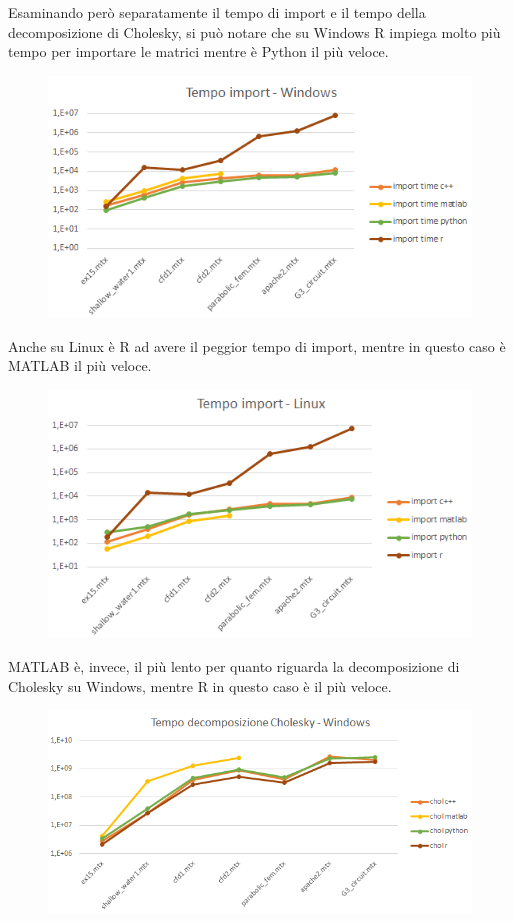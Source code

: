 \documentclass[a4paper,10pt]{article}
\begin{document}
Esaminando però separatamente il tempo di import e il tempo della decomposizione di Cholesky, si può notare che su Windows R impiega molto più tempo per importare le matrici mentre è Python il più veloce.

\begin{figure}[H]
\centering
  \includegraphics[width=0.6\linewidth]{img/tempoimpwin.png}
\end{figure}

Anche su Linux è R ad avere il peggior tempo di import, mentre in questo caso è MATLAB il più veloce.
\begin{figure}[H]
\centering
  \includegraphics[width=0.57\linewidth]{img/tempoimplinux.png}
\end{figure}


MATLAB è, invece, il più lento per quanto riguarda la decomposizione di Cholesky su Windows, mentre R in questo caso è il più veloce.

\begin{figure}[H]
\centering
  \includegraphics[width=0.6\linewidth]{img/tempocholwin.png}
\end{figure}
\end{document}
